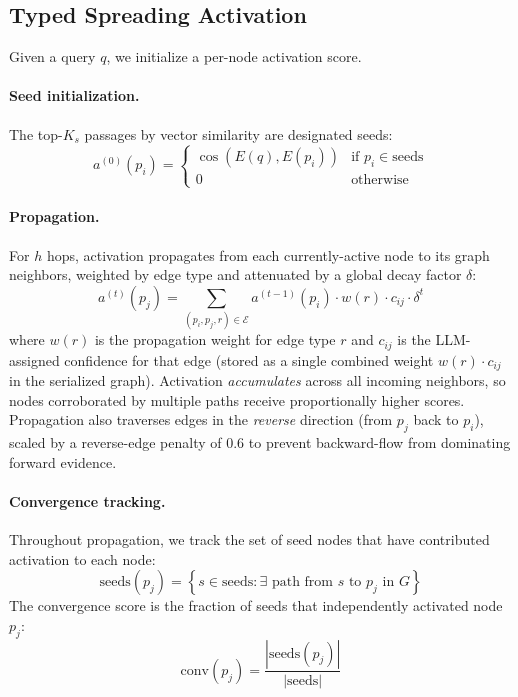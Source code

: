 \documentclass[11pt,a4paper]{article}
\begin{document}
\subsection{Typed Spreading Activation}
\label{sec:activation}

Given a query $q$, we initialize a per-node activation score.

\paragraph{Seed initialization.}
The top-$K_s$ passages by vector similarity are designated seeds:
\[
  a^{(0)}(p_i) = \begin{cases}
    \cos(E(q), E(p_i)) & \text{if } p_i \in \text{seeds} \\
    0 & \text{otherwise}
  \end{cases}
\]

\paragraph{Propagation.}
For $h$ hops, activation propagates from each currently-active node
to its graph neighbors, weighted by edge type and attenuated by a
global decay factor $\delta$:
\[
  a^{(t)}(p_j) = \sum_{(p_i, p_j, r) \in \mathcal{E}}
    a^{(t-1)}(p_i) \cdot w(r) \cdot c_{ij} \cdot \delta^t
\]
where $w(r)$ is the propagation weight for edge type $r$ and $c_{ij}$ is
the LLM-assigned confidence for that edge (stored as a single combined
weight $w(r) \cdot c_{ij}$ in the serialized graph).  Activation
\emph{accumulates} across all incoming neighbors, so nodes corroborated
by multiple paths receive proportionally higher scores.  Propagation also
traverses edges in the \emph{reverse} direction (from $p_j$ back to
$p_i$), scaled by a reverse-edge penalty of $0.6$ to prevent
backward-flow from dominating forward evidence.

\paragraph{Convergence tracking.}
Throughout propagation, we track the set of seed nodes that have
contributed activation to each node:
\[
  \text{seeds}(p_j) = \left\{ s \in \text{seeds} :
    \exists \text{ path from } s \text{ to } p_j \text{ in } G \right\}
\]
The convergence score is the fraction of seeds that independently
activated node $p_j$:
\[
  \text{conv}(p_j) = \frac{|\text{seeds}(p_j)|}{|\text{seeds}|}
\]
\end{document}
